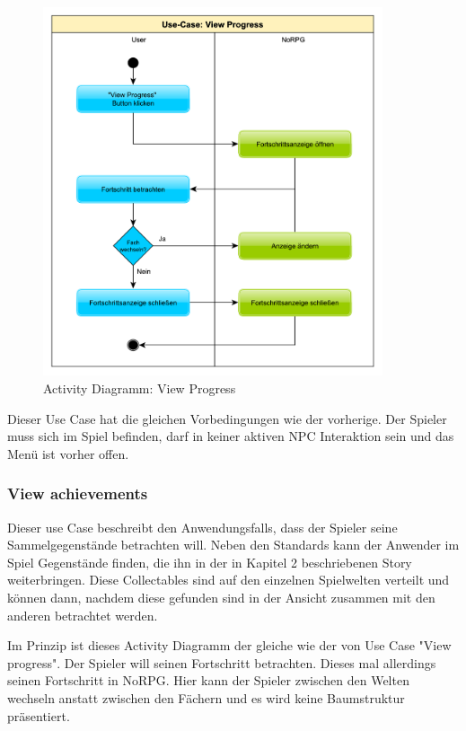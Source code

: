 			\begin{figure}[htbp]
				\centering 
				\label{umlViewProgess}
				\includegraphics[width=10cm]{pics/ViewProgress.pdf}
				\caption{Activity Diagramm: View Progress}
			\end{figure}
	
			Dieser Use Case hat die gleichen Vorbedingungen wie der vorherige. Der Spieler muss sich im Spiel befinden, darf in keiner aktiven \ac{NPC} Interaktion sein und das Menü ist vorher offen.
	
		\subsubsection{View achievements}
			Dieser use Case beschreibt den Anwendungsfalls, dass der Spieler seine Sammelgegenstände betrachten will. Neben den Standards kann der Anwender im Spiel Gegenstände finden, die ihn in der in Kapitel 2 beschriebenen Story weiterbringen. Diese Collectables sind auf den einzelnen Spielwelten verteilt und können dann, nachdem diese gefunden sind in der Ansicht zusammen mit den anderen betrachtet werden.
			
			Im Prinzip ist dieses Activity Diagramm der gleiche wie der von Use Case "View progress". Der Spieler will seinen Fortschritt betrachten. Dieses mal allerdings seinen Fortschritt in NoRPG. Hier kann der Spieler zwischen den Welten wechseln anstatt zwischen den Fächern und es wird keine Baumstruktur präsentiert.
			

